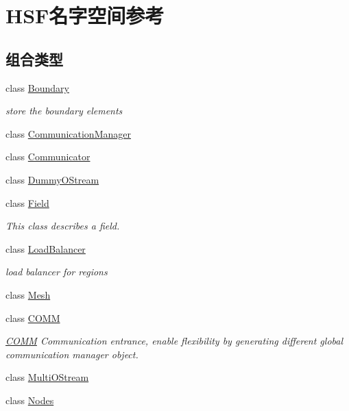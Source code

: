 \hypertarget{namespaceHSF}{
\section{HSF名字空间参考}
\label{namespaceHSF}
}
\subsection*{组合类型}
\begin{DoxyCompactItemize}
\item 
class \hyperlink{classHSF_1_1Boundary}{Boundary}
\begin{DoxyCompactList}\small\item\em store the boundary elements \item\end{DoxyCompactList}\item 
class \hyperlink{classHSF_1_1CommunicationManager}{CommunicationManager}
\item 
class \hyperlink{classHSF_1_1Communicator}{Communicator}
\item 
class \hyperlink{classHSF_1_1DummyOStream}{DummyOStream}
\item 
class \hyperlink{classHSF_1_1Field}{Field}
\begin{DoxyCompactList}\small\item\em This class describes a field. \item\end{DoxyCompactList}\item 
class \hyperlink{classHSF_1_1LoadBalancer}{LoadBalancer}
\begin{DoxyCompactList}\small\item\em load balancer for regions \item\end{DoxyCompactList}\item 
class \hyperlink{classHSF_1_1Mesh}{Mesh}
\item 
class \hyperlink{classHSF_1_1COMM}{COMM}
\begin{DoxyCompactList}\small\item\em \hyperlink{classHSF_1_1COMM}{COMM} Communication entrance, enable flexibility by generating different global communication manager object. \item\end{DoxyCompactList}\item 
class \hyperlink{classHSF_1_1MultiOStream}{MultiOStream}
\item 
class \hyperlink{classHSF_1_1Nodes}{Nodes}

\end{DoxyCompactItemize}
